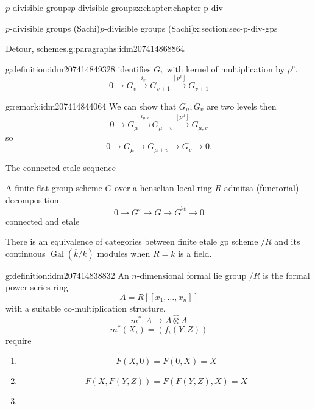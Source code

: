 \documentclass[oneside,10pt,]{book}
\numberwithin{equation}{section}
\newcommand{\lb}{[}
\newcommand{\rb}{]}
\newcommand{\et}{\mathrm{\acute{e}t}}
\newcommand{\absgal}[1]{\operatorname{Gal}(\overline{#1}/#1)}
\begin{document}
\begin{chapterptx}{\(p\)-divisible groups}{}{\(p\)-divisible groups}{}{}{x:chapter:chapter-p-div}
\begin{sectionptx}{\(p\)-divisible groups (Sachi)}{}{\(p\)-divisible groups (Sachi)}{}{}{x:section:sec-p-div-gps}
\begin{paragraphs}{Detour, schemes.}{g:paragraphs:idm207414868864}
\begin{definition}{}{g:definition:idm207414849328}
identifies \(G_v\) with kernel of multiplication by \(p^v\).%
\begin{equation*}
0 \to G_v \xrightarrow{i_v} G_{v+1} \xrightarrow{[p^v]} G_{v+1}
\end{equation*}
%
\end{definition}
\begin{remark}{}{g:remark:idm207414844064}%
We can show that \(G_\mu,G_v\) are two levels then%
\begin{equation*}
0 \to G_\mu \xrightarrow{i_{\mu, v}} G_{\mu +v } \xrightarrow{[p^\mu]} G_{\mu,v}
\end{equation*}
so%
\begin{equation*}
0 \to G_\mu \to G_{\mu + v}  \to G_v \to 0\text{.}
\end{equation*}
%
\end{remark}
The connected etale sequence%
\par
A finite flat group scheme \(G\) over a henselian local ring \(R\) admitsa (functorial) decomposition%
\begin{equation*}
0  \to G^\circ \to G \to G^\et \to 0
\end{equation*}
connected and etale%
\par
There is an equivalence of categories between finite etale gp scheme \(/R\) and its continuous \(\absgal k\) modules when \(R = k\) is a field.%
\begin{definition}{}{g:definition:idm207414838832}%
An \(n\)-dimensional formal lie group \(/R\) is the formal power series ring%
\begin{equation*}
A = R\lb \lb x_1, \ldots, x_n \rb\rb
\end{equation*}
with a suitable co-multiplication structure.%
\begin{equation*}
m^* \colon A \to A\widehat \otimes A
\end{equation*}
%
\begin{equation*}
m^*(X_i) = (f_i(Y,Z))
\end{equation*}
require%
\begin{enumerate}
\item{}%
\begin{equation*}
F(X,0) = F(0,X) = X
\end{equation*}
%
\item{}%
\begin{equation*}
F(X,F(Y,Z)) = F(F(Y,Z),X) = X
\end{equation*}
%
\item{}%
\begin{equation*}

\end{equation*}
\end{enumerate}
\end{definition}
\end{paragraphs}
\end{sectionptx}
\end{chapterptx}
\end{document}
